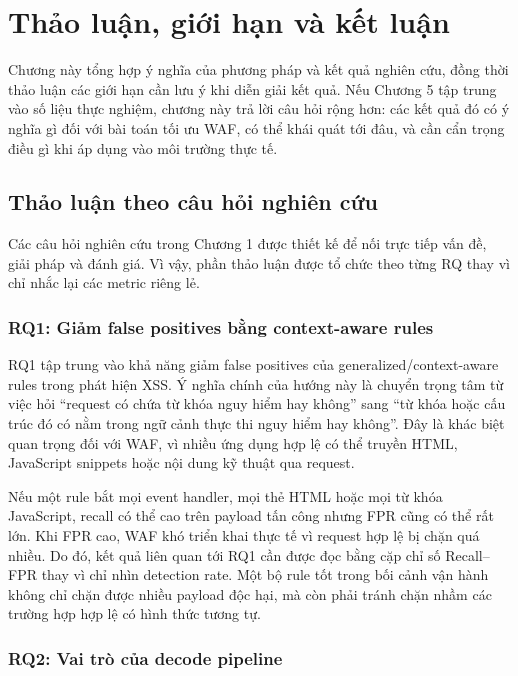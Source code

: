\chapter{Thảo luận, giới hạn và kết luận}
\label{chap:discussion-conclusion}

Chương này tổng hợp ý nghĩa của phương pháp và kết quả nghiên cứu, đồng thời thảo luận các giới hạn cần lưu ý khi diễn giải kết quả. Nếu Chương 5 tập trung vào số liệu thực nghiệm, chương này trả lời câu hỏi rộng hơn: các kết quả đó có ý nghĩa gì đối với bài toán tối ưu WAF, có thể khái quát tới đâu, và cần cẩn trọng điều gì khi áp dụng vào môi trường thực tế.

\section{Thảo luận theo câu hỏi nghiên cứu}
\label{sec:discussion-by-rq}

Các câu hỏi nghiên cứu trong Chương 1 được thiết kế để nối trực tiếp vấn đề, giải pháp và đánh giá. Vì vậy, phần thảo luận được tổ chức theo từng RQ thay vì chỉ nhắc lại các metric riêng lẻ.

\subsection{RQ1: Giảm false positives bằng context-aware rules}
\label{subsec:discussion-rq1}

RQ1 tập trung vào khả năng giảm false positives của generalized/context-aware rules trong phát hiện XSS. Ý nghĩa chính của hướng này là chuyển trọng tâm từ việc hỏi ``request có chứa từ khóa nguy hiểm hay không'' sang ``từ khóa hoặc cấu trúc đó có nằm trong ngữ cảnh thực thi nguy hiểm hay không''. Đây là khác biệt quan trọng đối với WAF, vì nhiều ứng dụng hợp lệ có thể truyền HTML, JavaScript snippets hoặc nội dung kỹ thuật qua request.

Nếu một rule bắt mọi event handler, mọi thẻ HTML hoặc mọi từ khóa JavaScript, recall có thể cao trên payload tấn công nhưng FPR cũng có thể rất lớn. Khi FPR cao, WAF khó triển khai thực tế vì request hợp lệ bị chặn quá nhiều. Do đó, kết quả liên quan tới RQ1 cần được đọc bằng cặp chỉ số Recall--FPR thay vì chỉ nhìn detection rate. Một bộ rule tốt trong bối cảnh vận hành không chỉ chặn được nhiều payload độc hại, mà còn phải tránh chặn nhầm các trường hợp hợp lệ có hình thức tương tự.

\subsection{RQ2: Vai trò của decode pipeline}
\label{subsec:discussion-rq2}

